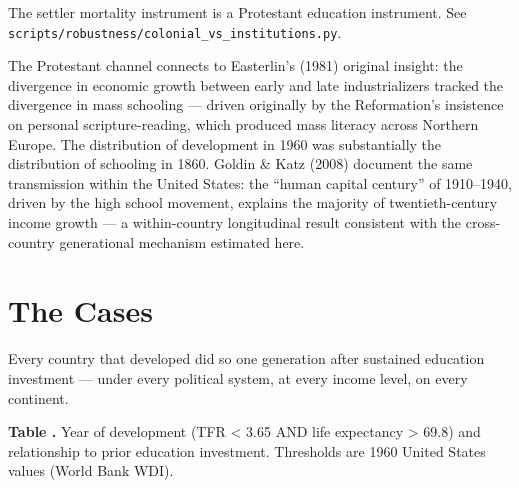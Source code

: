 \documentclass[12pt,letterpaper]{article}
\begin{document}
The settler mortality instrument is a
Protestant education instrument.
See \texttt{scripts/robustness/colonial\_vs\_institutions.py}.

The Protestant channel connects to Easterlin's (1981) original insight:
the divergence in economic growth between early and late industrializers
tracked the divergence in mass schooling --- driven originally by the
Reformation's insistence on personal scripture-reading, which produced
mass literacy across Northern Europe. The distribution of development in
1960 was substantially the distribution of schooling in 1860. Goldin \&
Katz (2008) document the same transmission within the United States: the
``human capital century'' of 1910--1940, driven by the high school
movement, explains the majority of twentieth-century income growth --- a
within-country longitudinal result consistent with the cross-country
generational mechanism estimated here.

\section{The Cases}\label{the-cases}

Every country that developed did so one generation after sustained education investment --- under every political system, at every income level, on every continent.

\label{tab:5}\textbf{Table \thetable.} Year of development (TFR \textless{} 3.65 AND life
expectancy \textgreater{} 69.8) and relationship to prior education
investment. Thresholds are 1960 United States values (World Bank WDI).
\end{document}
